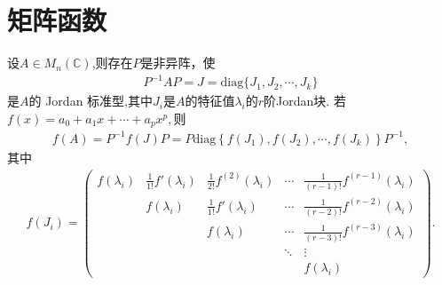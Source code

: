 \documentclass[../../main.tex]{subfiles}
\begin{document}
\section{矩阵函数}

\begin{lemma}\label{lemma:利用Jordan标准型计算复矩阵的多项式}
设$A\in M_n(\mathbb{C})$,则存在\(P\)是非异阵，使
\begin{align*}
P^{-1}AP = J = \mathrm{diag}\{J_1,J_2,\cdots,J_k\}
\end{align*}
是\(A\)的 Jordan 标准型,其中$J_i$是$A$的特征值$\lambda_i$的$r$阶Jordan块.
若$f(x)=a_0+a_1x+\cdots+a_px^p,$则
\begin{align*}
f(A)=P^{-1}f(J)P=P\mathrm{diag}\left\{ f\left( J_1 \right) ,f\left( J_2 \right) ,\cdots ,f\left( J_k \right) \right\} P^{-1},
\end{align*}
其中
\begin{align*}
f(J_i)= \begin{pmatrix}
f(\lambda_i) & \frac{1}{1!}f'(\lambda_i) & \frac{1}{2!}f^{(2)}(\lambda_i) & \cdots & \frac{1}{(r - 1)!}f^{(r - 1)}(\lambda_i) \\
 & f(\lambda_i) & \frac{1}{1!}f'(\lambda_i) & \cdots & \frac{1}{(r - 2)!}f^{(r - 2)}(\lambda_i) \\
 & & f(\lambda_i) & \cdots & \frac{1}{(r - 3)!}f^{(r - 3)}(\lambda_i) \\
 & & & \ddots & \vdots \\
 & & & & f(\lambda_i)
\end{pmatrix}. 
\end{align*}
\end{lemma}
\end{document}
